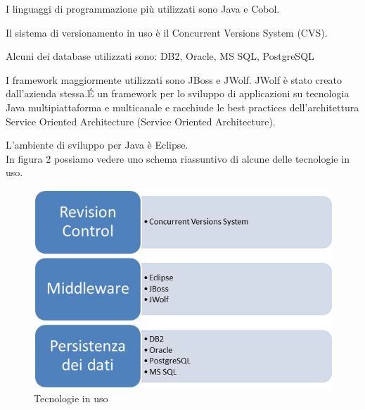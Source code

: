 I linguaggi di programmazione più utilizzati sono Java e Cobol.

Il sistema di versionamento in uso è il Concurrent Versions System (CVS).

Alcuni dei database utilizzati sono: DB2, Oracle, MS SQL, PostgreSQL

I framework maggiormente utilizzati sono JBoss e JWolf. JWolf è stato creato dall'azienda stessa.\'{E} un framework per lo sviluppo di applicazioni su tecnologia Java multipiattaforma e multicanale e racchiude le best practices dell'architettura Service Oriented Architecture (\gls{Service Oriented Architecture}).

L'ambiente di sviluppo per Java è Eclipse.\\

In figura 2 possiamo vedere uno schema riassuntivo di alcune delle tecnologie in uso.
\begin{figure}[H]
\centering
\includegraphics[scale=0.55]{../Logo&Header/tecnologieUsate.png}
\caption{Tecnologie in uso}
\end{figure}


